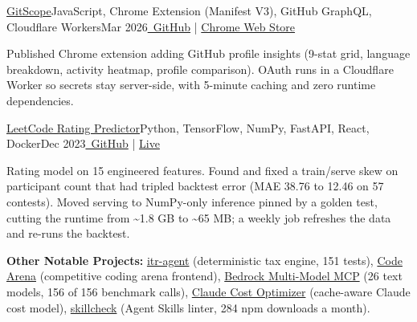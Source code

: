 \resumeExp
{\href{https://github.com/Sagargupta16/GitScope}{GitScope}}{JavaScript, Chrome Extension (Manifest V3), GitHub GraphQL, Cloudflare Workers}{Mar 2026}{\href{https://github.com/Sagargupta16/GitScope}{\faGithub\ GitHub} | \href{https://chromewebstore.google.com/detail/gitscope/fndaanihifimmlnmkjdmjbbkbdajolff}{Chrome Web Store}}
\resumeItemListStart
    \item[$\diamond$] Published Chrome extension adding GitHub profile insights (9-stat grid, language breakdown, activity heatmap, profile comparison). OAuth runs in a Cloudflare Worker so secrets stay server-side, with 5-minute caching and zero runtime dependencies.
\resumeItemListEnd

\resumeExp
{\href{https://leetcode-rating-predictor.onrender.com/}{LeetCode Rating Predictor}}{Python, TensorFlow, NumPy, FastAPI, React, Docker}{Dec 2023}{\href{https://github.com/Sagargupta16/LeetCode_Rating_Predictor}{\faGithub\ GitHub} | \href{https://leetcode-rating-predictor.onrender.com/}{Live}}
\resumeItemListStart
    \item[$\diamond$] Rating model on 15 engineered features. Found and fixed a train/serve skew on participant count that had tripled backtest error (MAE 38.76 to 12.46 on 57 contests). Moved serving to NumPy-only inference pinned by a golden test, cutting the runtime from \textasciitilde1.8 GB to \textasciitilde65 MB; a weekly job refreshes the data and re-runs the backtest.
\resumeItemListEnd

\resumeSubHeadingListEnd
\vspace{-2pt}
\small{\textbf{Other Notable Projects:} \href{https://github.com/Sagargupta16/itr-agent}{itr-agent} (deterministic tax engine, 151 tests), \href{https://github.com/Sagargupta16/code-arena}{Code Arena} (competitive coding arena frontend), \href{https://github.com/Sagargupta16/bedrock-multi-model-mcp}{Bedrock Multi-Model MCP} (26 text models, 156 of 156 benchmark calls), \href{https://github.com/Sagargupta16/claude-cost-optimizer}{Claude Cost Optimizer} (cache-aware Claude cost model), \href{https://github.com/Sagargupta16/skillcheck}{skillcheck} (Agent Skills linter, 284 npm downloads a month).}
\vspace{-2mm}

